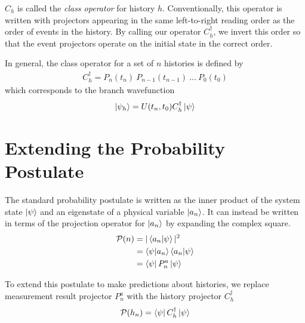 $C_h$ is called the \textit{class operator} for history $h$.  Conventionally, this operator is written with projectors appearing in the same left-to-right reading order as the order of events in the history. By calling our operator $C_h^\dagger$, we invert this order so that the event projectors operate on the initial state in the correct order.

In general, the class operator for a set of $n$ histories is defined by
\begin{align}
  C_h^\dagger = P_n(t_n) \: P_{n-1}(t_{n-1}) \: ... \: P_0(t_0)
\end{align}
which corresponds to the branch wavefunction
\begin{align}
  \ket{\psi_h} = U(t_n, t_0) C_h^\dagger \ket{\psi}
\end{align}

\section{Extending the Probability Postulate}

The standard probability postulate is written as the inner product of the system state $\ket{\psi}$ and an eigenstate of a physical variable $\ket{a_n}$. It can instead be written in terms of the projection operator for $\ket{a_n}$ by expanding the complex square.
\begin{align}
        \mathcal{P}(n) &= |\braket{a_n|\psi}|^2 \\ \nonumber
        &= \braket{\psi|a_n} \braket{a_n|\psi} \\ \nonumber
        &= \bra{\psi} P^a_n \ket{\psi}
\end{align}

To extend this postulate to make predictions about histories, we replace measurement result projector $P^a_n$ with the history projector $C_h^\dagger$
\begin{align}
  \mathcal{P}(h_n) = \bra{\psi} C_h^\dagger \ket{\psi}
\end{align}

